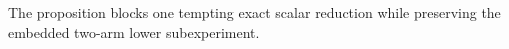 The proposition blocks one tempting exact scalar reduction while preserving the embedded two-arm lower subexperiment.